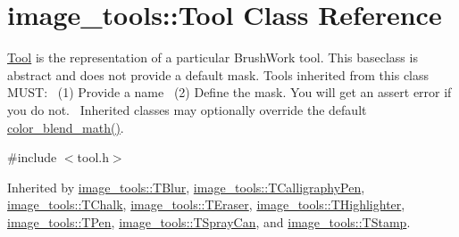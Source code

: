 \hypertarget{classimage__tools_1_1Tool}{}\section{image\+\_\+tools\+:\+:Tool Class Reference}
\label{classimage__tools_1_1Tool}


\hyperlink{classimage__tools_1_1Tool}{Tool} is the representation of a particular Brush\+Work tool. This baseclass is abstract and does not provide a default mask. Tools inherited from this class M\+U\+ST\+:~\newline
(1) Provide a name~\newline
(2) Define the mask. You will get an assert error if you do not.~\newline
Inherited classes may optionally override the default \hyperlink{classimage__tools_1_1Tool_adca00cc3d94a4ca7bdf15d323754e105}{color\+\_\+blend\+\_\+math()}.  




{\ttfamily \#include $<$tool.\+h$>$}



Inherited by \hyperlink{classimage__tools_1_1TBlur}{image\+\_\+tools\+::\+T\+Blur}, \hyperlink{classimage__tools_1_1TCalligraphyPen}{image\+\_\+tools\+::\+T\+Calligraphy\+Pen}, \hyperlink{classimage__tools_1_1TChalk}{image\+\_\+tools\+::\+T\+Chalk}, \hyperlink{classimage__tools_1_1TEraser}{image\+\_\+tools\+::\+T\+Eraser}, \hyperlink{classimage__tools_1_1THighlighter}{image\+\_\+tools\+::\+T\+Highlighter}, \hyperlink{classimage__tools_1_1TPen}{image\+\_\+tools\+::\+T\+Pen}, \hyperlink{classimage__tools_1_1TSprayCan}{image\+\_\+tools\+::\+T\+Spray\+Can}, and \hyperlink{classimage__tools_1_1TStamp}{image\+\_\+tools\+::\+T\+Stamp}.

